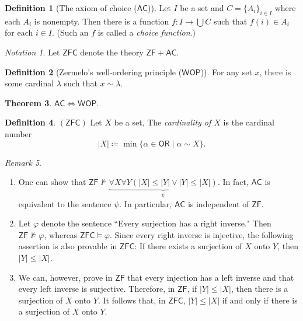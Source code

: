 \documentclass[10pt,letterpaper,cm]{nupset}
\theoremstyle{definition}
\newtheorem{definition}{Definition}[subsection]
\theoremstyle{theorem}
\newtheorem{theorem}[definition]{Theorem}
\theoremstyle{remark}
\newtheorem{remark}[definition]{Remark}
\newtheorem*{notation}{Notation}
\newcommand{\1}{\mathbf{1}}
\newcommand{\0}{\vec 0}
\newcommand{\zf}{\mathsf{ZF}}
\newcommand{\zfc}{\mathsf{ZFC}}
\newcommand{\ac}{\mathsf{AC}}
\newcommand{\ord}{\mathsf{OR}}
\begin{document}
\begin{definition}[The axiom of choice ($\ac$)]
Let $I$ be a set and $C = \{A_i  \}_{i\in I}$ where each $A_i$ is nonempty. Then there is a function $f : I \to \bigcup{C}$ such that $f(i) \in A_i$ for each $i\in I$. (Such an $f$ is called a \textit{choice function}.)
\end{definition}


\begin{notation}
Let $\zfc$ denote the theory $\zf + \ac$.
\end{notation}

\begin{definition}[Zermelo's well-ordering principle ($\mathsf{WOP}$)]
For any set $x$, there is some cardinal $\lambda$ such that $x \sim \lambda$.
\end{definition}

\begin{theorem}\label{AW}
$\ac \iff \mathsf{WOP}$.
\end{theorem}

\begin{definition}{$(\zfc)$}
Let $X$ be a set, The \textit{cardinality of $X$} is the cardinal number $$\left\lvert{X}\right\rvert \coloneqq \min\{\alpha \in \ord \mid \alpha \sim X\}.$$
\end{definition}

\begin{remark}\label{LR} $ $
\begin{enumerate}
\item One can show that $\zf \nvDash \underbrace{\forall X\forall Y(\left\lvert{X}\right\rvert \leq \left\lvert{Y}\right\rvert \vee \left\lvert{Y}\right\rvert \leq \left\lvert{X}\right\rvert)}_{\psi}$. In fact,  $\ac$ is equivalent to the sentence $\psi$. In particular, $\ac$ is independent of $\zf$.
\item Let $\varphi$ denote the sentence ``Every surjection has a right inverse."  Then $\zf \nvDash \varphi$, whereas  $\zfc \models \varphi$. Since every right inverse is injective, the following assertion is also provable in $\zfc$: If there exists a surjection of $X$ onto $Y$, then $\left\lvert{Y}\right\rvert \leq \left\lvert{X}\right\rvert$. 
\item We can, however, prove in $\zf$ that every injection has a left inverse and that every left inverse is surjective. Therefore, in $\zf$, if $\left\lvert{Y}\right\rvert \leq \left\lvert{X}\right\rvert$, then there is a surjection of $X$ onto $Y$. It follows that, in $\zfc$, $\left\lvert{Y}\right\rvert \leq \left\lvert{X}\right\rvert$ if and only if there is a surjection of $X$ onto $Y$.
\end{enumerate}
\end{remark}
\end{document}
